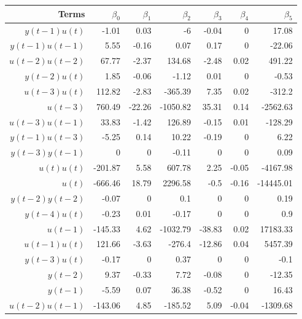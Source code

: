 \begin{tabular}{rrrrrrr}
Terms & $\beta_0$ & $\beta_1$ & $\beta_2$ & $\beta_3$ & $\beta_4$ & $\beta_5$ \\ 
\hline 
$y(t-1)u(t)$ & -1.01 & 0.03 & -6 & -0.04 & 0 & 17.08 \\ 
$y(t-1)u(t-1)$ & 5.55 & -0.16 & 0.07 & 0.17 & 0 & -22.06 \\ 
$u(t-2)u(t-2)$ & 67.77 & -2.37 & 134.68 & -2.48 & 0.02 & 491.22 \\ 
$y(t-2)u(t)$ & 1.85 & -0.06 & -1.12 & 0.01 & 0 & -0.53 \\ 
$u(t-3)u(t)$ & 112.82 & -2.83 & -365.39 & 7.35 & 0.02 & -312.2 \\ 
$u(t-3)$ & 760.49 & -22.26 & -1050.82 & 35.31 & 0.14 & -2562.63 \\ 
$u(t-3)u(t-1)$ & 33.83 & -1.42 & 126.89 & -0.15 & 0.01 & -128.29 \\ 
$y(t-1)u(t-3)$ & -5.25 & 0.14 & 10.22 & -0.19 & 0 & 6.22 \\ 
$y(t-3)y(t-1)$ & 0 & 0 & -0.11 & 0 & 0 & 0.09 \\ 
$u(t)u(t)$ & -201.87 & 5.58 & 607.78 & 2.25 & -0.05 & -4167.98 \\ 
$u(t)$ & -666.46 & 18.79 & 2296.58 & -0.5 & -0.16 & -14445.01 \\ 
$y(t-2)y(t-2)$ & -0.07 & 0 & 0.1 & 0 & 0 & 0.19 \\ 
$y(t-4)u(t)$ & -0.23 & 0.01 & -0.17 & 0 & 0 & 0.9 \\ 
$u(t-1)$ & -145.33 & 4.62 & -1032.79 & -38.83 & 0.02 & 17183.33 \\ 
$u(t-1)u(t)$ & 121.66 & -3.63 & -276.4 & -12.86 & 0.04 & 5457.39 \\ 
$y(t-3)u(t)$ & -0.17 & 0 & 0.37 & 0 & 0 & -0.1 \\ 
$y(t-2)$ & 9.37 & -0.33 & 7.72 & -0.08 & 0 & -12.35 \\ 
$y(t-1)$ & -5.59 & 0.07 & 36.38 & -0.52 & 0 & 16.43 \\ 
$u(t-2)u(t-1)$ & -143.06 & 4.85 & -185.52 & 5.09 & -0.04 & -1309.68 \\ 
\hline 
\end{tabular}